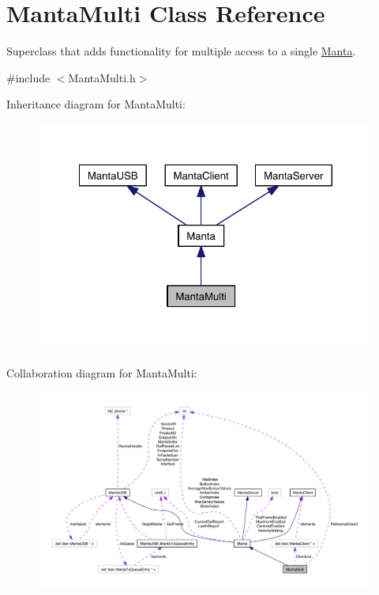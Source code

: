 \hypertarget{classMantaMulti}{\section{\-Manta\-Multi \-Class \-Reference}
\label{classMantaMulti}
}


\-Superclass that adds functionality for multiple access to a single \hyperlink{classManta}{\-Manta}.  




{\ttfamily \#include $<$\-Manta\-Multi.\-h$>$}



\-Inheritance diagram for \-Manta\-Multi\-:\nopagebreak
\begin{figure}[H]
\begin{center}
\leavevmode
\includegraphics[width=322pt]{classMantaMulti__inherit__graph}
\end{center}
\end{figure}


\-Collaboration diagram for \-Manta\-Multi\-:\nopagebreak
\begin{figure}[H]
\begin{center}
\leavevmode
\includegraphics[width=350pt]{classMantaMulti__coll__graph}
\end{center}
\end{figure}
